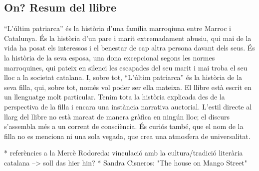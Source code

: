 \begin{comment}
[Penny2014]

"How are men supposed to cope with this loss of power in a society that still insists that the only way to be a man is to grab as much power as possible, to be rich, to be capable of extreme violence, to dominate other men physically and to dominate women sexually and emotionally? The received wisdom is that they're not supposed to cope. Without power over others, particularly over women, men are supposed to crumble, to lash out, to collapse in an extravagant welter of identity implosion that leaves a suspicious mess on the carpet." (p.64)

"'Patriarchy' does not mean 'the rule of men'. It means 'the rule of fathers' - literally, the rule of powerful heads of household over everybody else in society. Men further down the social chain were expected to be content with having power over women in order to make up for their lack of control over the rest of their lives.
[...]
Most individual men do not rule very much, and they never have. Most individual men don't have a lot of power, and now the small amount of social and sexual superiority they held over women is being questioned." (p.69-70)

"There are two big secrets about 'traditional masculine power' that mainstream culture does not want us to discuss, and it is imperative that we discuss them honestly [...]
The first big secret is this: most men have never really been powerful. Throughout human history, the vast majority of men have had almost no structural power, except over women and children. In fact, the power over women and children - technical and physical dominance within the sphere of one's own home - has been the sop offered to men who had almost no power outside of it." (p.75)

"Thus, a poor man working a job he hated could once expect to feel, at the very least, superior to his wife and children, to be master of his home even if he was treated like a slave outside it." (p.76)
\end{comment}

\subsection{On? Resum del llibre}
``L'últim patriarca'' és la història d'una família marroqiuna entre Marroc i Catalunya.
És la història d'un pare i marit extremadament abusiu, qui mai de la vida ha posat els interessos i el benestar de cap altra persona davant dels seus.
És la història de la seva esposa, una dona excepcional segons les normes marroquines, qui pateix en silenci les escapades del seu marit i mai troba el seu lloc a la societat catalana.
I, sobre tot, ``L'últim patriarca'' és la història de la seva filla, qui, sobre tot, només vol poder ser ella mateixa.
El llibre està escrit en un llenguatge molt particular.
Tenim tota la història explicada des de la perspectiva de la filla i encara una instància narrativa auctorial.
L'estil directe al llarg del llibre no està marcat de manera gràfica en ningún lloc; el discurs s'assembla més a un corrent de consciència.
És curiós també, que el nom de la filla no es menciona ni una sola vegada, que crea una atmosfera de universalitat.

* referències a la Mercè Rodoreda: vinculació amb la cultura/tradició literària catalana --> soll das hier hin?
* Sandra Cisneros: "The house on Mango Street"
